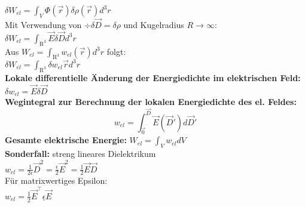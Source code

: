 \documentclass[english]{latex4ei/latex4ei_sheet}
\begin{document}
$\delta W_{el}=\int_V \Phi (\vec{r}) \delta \rho(\vec{r}) d^3 r$\\
Mit Verwendung von $\div \delta \vec{D} = \delta \rho$ und Kugelradius $R \to \infty$:\\
$\delta W_{el}=\int_{\mathrm{R}^3} \vec{E} \delta \vec{D} d^3 r$\\
Aus $W_{el}=\int_{\mathrm{R}^3} w_{el}(\vec{r}) d^3 r$ folgt:\\
$\delta W_{el} = \int_{\mathrm{R}^3} \delta w_{el}{\vec{r}}d^3 r$\\
\textbf{Lokale differentielle \"Anderung der Energiedichte im elektrischen Feld:}\\
$\delta w_{el}=\vec{E}\delta \vec{D}$\\
\textbf{Wegintegral zur Berechnung der lokalen Energiedichte des el. Feldes:}\\
\[w_{el}=\int_{\vec{0}}^{\vec{D}}\vec{E}(\vec{D}')d\vec{D}'\] 
\textbf{Gesamte elektrische Energie:} $W_{el}=\int_V w_{el} d V$\\
\textbf{Sonderfall:} streng lineares Dielektrikum\\
$w_{el}=\frac{1}{2 \epsilon}\vec{D}^2=\frac{\epsilon}{2}\vec{E}^2=\frac{1}{2}\vec{E}\vec{D}$\\
F\"ur matrixwertiges Epsilon:\\
$w_{el}=\frac{1}{2}\vec{E}^\top \underline{\epsilon}\vec{E}$
\end{document}
